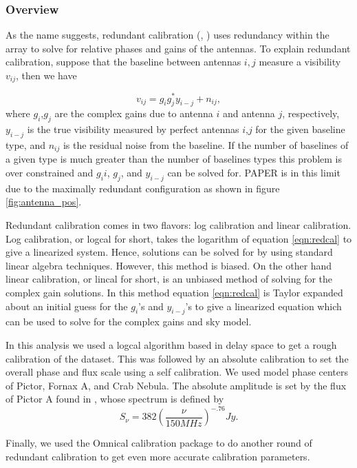 \documentclass[twocolumn,numberedappendix]{emulateapj}
\begin{document}
\subsubsection{Overview}
As the name suggests, redundant calibration (\cite{liu_et_al2010},
\cite{zheng_et_al2014}) uses redundancy within the array to solve for relative
phases and gains of the antennas. To explain redundant calibration, suppose that
the baseline between antennas $i,j$ measure a visibility $v_{ij}$, then we have 

\begin{equation}\label{eqn:redcal}
    v_{ij} = g_{i}g_{j}^{*}y_{i-j} + n_{ij},   
\end{equation}
where $g_{i}$,$g_{j}$ are the complex gains due to antenna $i$ and antenna $j$,
respectively, $y_{i-j}$ is the true visibility measured by perfect antennas
$i$,$j$ for the given baseline type, and $n_{ij}$ is the residual noise from
the baseline.  If the number of baselines of a given type is much greater than
the number of baselines types this problem is over constrained and $g_{i}i$,
$g_{j}$, and $y_{i-j}$ can be solved for. PAPER is in this limit due to the
maximally redundant configuration as shown in figure \ref{fig:antenna_pos}. 

Redundant calibration comes in two flavors: log calibration and linear
calibration. Log calibration, or logcal for short, takes the logarithm of
equation \ref{eqn:redcal} to give a linearized system. Hence, solutions can be
solved for by using standard linear algebra techniques. However, this method is
biased. On the other hand linear calibration, or lincal for short, is an
unbiased method of solving for the complex gain solutions. In this method
equation \ref{eqn:redcal} is Taylor expanded about an initial guess for the
$g_{i}$'s and $y_{i-j}$'s to give a linearized equation which can be used to
solve for the complex gains and sky model. 

In this analysis we used a logcal algorithm based in delay space to get a rough
calibration of the dataset. This was followed by an absolute calibration to set
the overall phase and flux scale using a self calibration. We used model phase
centers of Pictor, Fornax A, and Crab Nebula. The absolute amplitude is set
by the flux of Pictor A found in \cite{jacobs_et_al2013}, whose spectrum is
defined by 
\begin{equation}
    S_{\nu} = 382(\frac{\nu}{150 MHz})^{-.76} Jy.
\end{equation}

Finally, we used the Omnical calibration package to do another round of
redundant calibration to get even more accurate calibration parameters.
\end{document}
